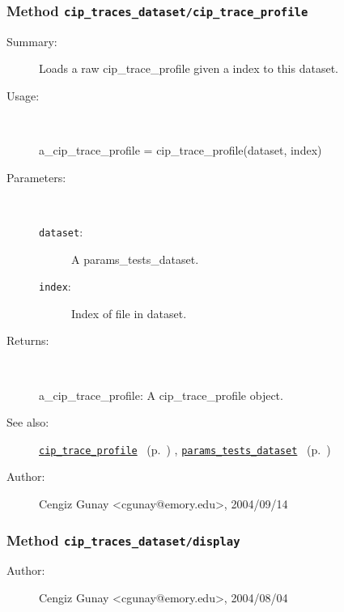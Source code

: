 \subsubsection[Method \texttt{cip\_trace\_profile}]{Method \texttt{cip\_traces\_dataset/cip\_trace\_profile}}%
%
\label{ref_cip_traces_dataset__cip_trace_profile}%
\hypertarget{ref_cip_traces_dataset__cip_trace_profile}{}%
\begin{description}
\item[Summary:]Loads a raw cip\_trace\_profile given a index 
		      to this dataset.
%
\item[Usage:]~%
\begin{lyxcode}%
a\_cip\_trace\_profile = cip\_trace\_profile(dataset, index)
%
\end{lyxcode}%
%
%
\item[Parameters:]~
\begin{description}%
\item[\texttt{dataset}:]
 A params\_tests\_dataset.
\item[\texttt{index}:]
 Index of file in dataset.
\end{description}%
%
\item[Returns:
]~

	a\_cip\_trace\_profile: A cip\_trace\_profile object.
%
%
\item[See also:]%
\hyperlink{ref_cip_trace_profile}{\texttt{cip\_trace\_profile}}%
\ (p.~\pageref{ref_cip_trace_profile})%
%
, \hyperlink{ref_params_tests_dataset}{\texttt{params\_tests\_dataset}}%
\ (p.~\pageref{ref_params_tests_dataset})%
%
%
\item[Author:]%
Cengiz Gunay <cgunay@emory.edu>, 2004/09/14
%
\end{description}
\methodline%
\subsubsection[Method \texttt{display}]{Method \texttt{cip\_traces\_dataset/display}}%
%
\label{ref_cip_traces_dataset__display}%
\hypertarget{ref_cip_traces_dataset__display}{}%
\begin{description}
%
%
%
%
%
%
%
\item[Author:]%
Cengiz Gunay <cgunay@emory.edu>, 2004/08/04
%
\end{description}
\methodline%
